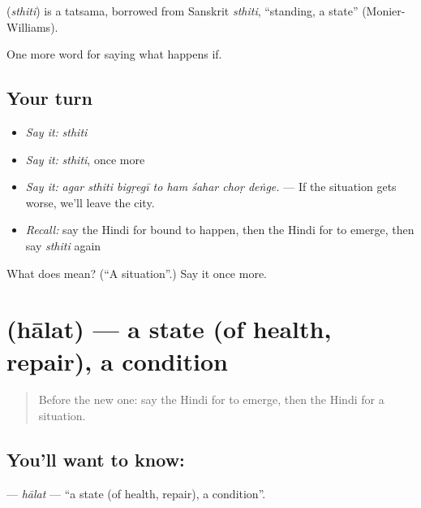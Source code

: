 \begin{cousinweb}
\textbf{} (\emph{sthiti}) is a tatsama, borrowed from Sanskrit \emph{sthiti}, \textquotedblleft{}standing, a state\textquotedblright{} (Monier-Williams).
\end{cousinweb}

\begin{grammarlens}[title={What you've built}]
One more word for saying what happens if.
\end{grammarlens}

\subsection*{Your turn}
\begin{itemize}
\raggedright
  \item \emph{Say it:} \emph{sthiti}
  \item \emph{Say it:} \emph{sthiti}, once more
  \item \emph{Say it:} \emph{agar sthiti bigṛegī to ham śahar choṛ deṅge.} — If the situation gets worse, we'll leave the city.
  \item \emph{Recall:} say the Hindi for bound to happen, then the Hindi for to emerge, then say \emph{sthiti} again
\end{itemize}

\begin{tcolorbox}[breakable,colback=teal!4,colframe=teal!35!black,title={Before you move on}]
What does  mean? (\textquotedblleft{}A situation\textquotedblright{}.) Say it once more.
\end{tcolorbox}
\section[\texorpdfstring{\hi{हालत} (hālat)}{हालत (hālat)}]{ (hālat) — a state (of health, repair), a condition}

\label{lesson:HI-C377-halat}



\begin{quote}
Before the new one: say the Hindi for to emerge, then the Hindi for a situation.
\end{quote}

\subsection*{You'll want to know: }
\textbf{} — \emph{hālat} — \textquotedblleft{}a state (of health, repair), a condition\textquotedblright{}.

